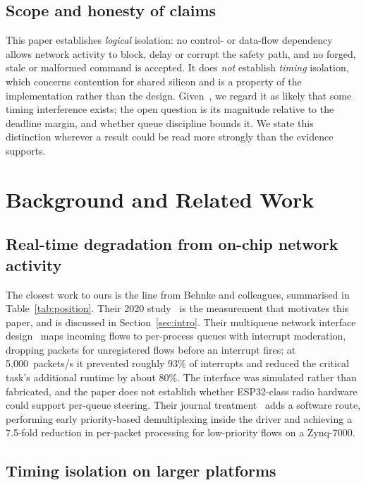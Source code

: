 \subsection{Scope and honesty of claims}

This paper establishes \emph{logical} isolation: no control- or data-flow dependency allows
network activity to block, delay or corrupt the safety path, and no forged, stale or malformed
command is accepted. It does \emph{not} establish \emph{timing} isolation, which concerns
contention for shared silicon and is a property of the implementation rather than the design.
Given~\cite{behnke2020}, we regard it as likely that some timing interference exists; the open
question is its magnitude relative to the deadline margin, and whether queue discipline bounds
it. We state this distinction wherever a result could be read more strongly than the evidence
supports.

\section{Background and Related Work}\label{sec:related}

\subsection{Real-time degradation from on-chip network activity}

The closest work to ours is the line from Behnke and colleagues, summarised in
Table~\ref{tab:position}. Their 2020 study~\cite{behnke2020} is the measurement that motivates
this paper, and is discussed in Section~\ref{sec:intro}. Their multiqueue network interface
design~\cite{behnke2022} maps incoming flows to per-process queues with interrupt moderation,
dropping packets for unregistered flows before an interrupt fires; at 5{,}000~packets/s it
prevented roughly 93\% of interrupts and reduced the critical task's additional runtime by about
80\%. The interface was simulated rather than fabricated, and the paper does not establish whether
ESP32-class radio hardware could support per-queue steering. Their journal
treatment~\cite{behnke2023} adds a software route, performing early priority-based demultiplexing
inside the driver and achieving a 7.5-fold reduction in per-packet processing for low-priority
flows on a Zynq-7000.

\subsection{Timing isolation on larger platforms}

